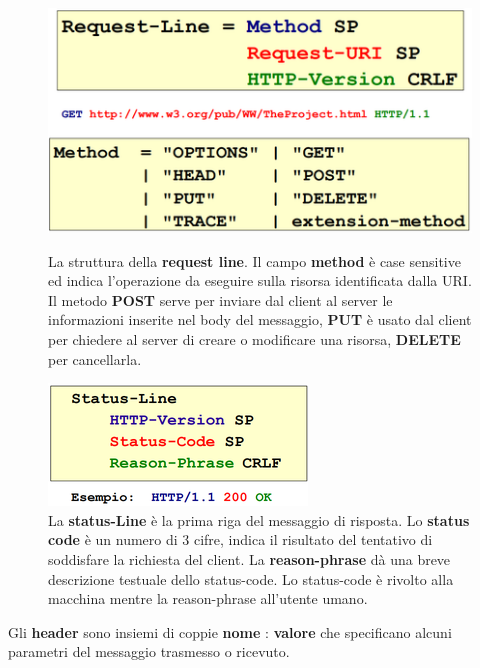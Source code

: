 \documentclass[11pt,a4paper,oneside]{book}
\theoremstyle{definition}
\begin{document}
\begin{figure}[!h]
	\includegraphics[scale=0.3]{Immagini/Req_line.png}
	\centering
	\caption{La struttura della \textbf{request line}. Il campo \textbf{method} è case sensitive ed indica l'operazione da eseguire sulla risorsa identificata dalla URI. Il metodo \textbf{POST} serve per inviare dal client al server le
		informazioni inserite nel body del messaggio, \textbf{PUT} è usato dal client per chiedere al server di creare o modificare una risorsa, \textbf{DELETE} per cancellarla.}
	\includegraphics[scale=0.4]{Immagini/Stat_line.png}
	\centering
	\caption{La \textbf{status-Line} è la prima riga del messaggio di risposta. Lo \textbf{status code} è un numero di 3 cifre, indica il risultato del tentativo di soddisfare la richiesta del client. La \textbf{reason-phrase} dà una breve descrizione testuale dello status-code. Lo status-code è rivolto alla macchina mentre la reason-phrase all'utente umano.}
\end{figure}
Gli \textbf{header} sono insiemi di coppie \textbf{nome} : \textbf{valore} che specificano
alcuni parametri del messaggio trasmesso o ricevuto.
\end{document}
